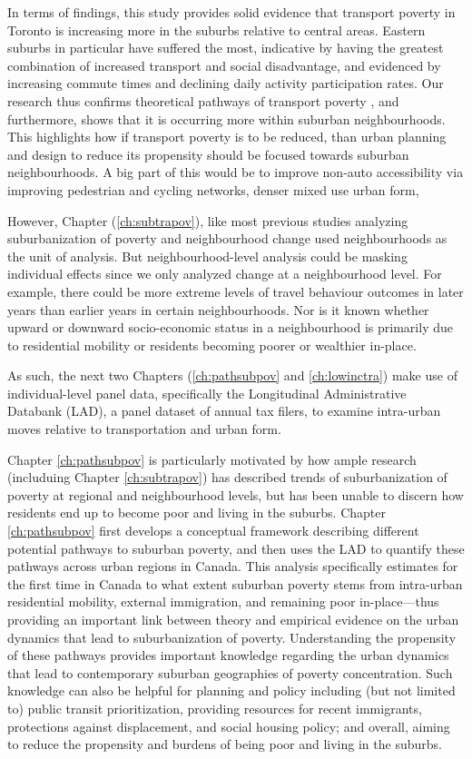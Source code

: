 In terms of findings, this study provides solid evidence that transport poverty in Toronto is increasing more in the suburbs relative to central areas. Eastern suburbs in particular have suffered the most, indicative by having the greatest combination of increased transport and social disadvantage, and evidenced by increasing commute times and declining daily activity participation rates. Our research thus confirms theoretical pathways of transport poverty \cite{lucas_transport_2012}, and furthermore, shows that it is occurring more within suburban neighbourhoods. This highlights how if transport poverty is to be reduced, than urban planning and design to reduce its propensity should be focused towards suburban neighbourhoods. A big part of this would be to improve non-auto accessibility via improving pedestrian and cycling networks, denser mixed use urban form, 

However, Chapter (\ref{ch:subtrapov}), like most previous studies analyzing suburbanization of poverty and neighbourhood change \cite{ades_are_2012,breau_pulling_2018,grant_changing_2020} used neighbourhoods as the unit of analysis. But neighbourhood-level analysis could be masking individual effects since we only analyzed change at a neighbourhood level. For example, there could be more extreme levels of travel behaviour outcomes in later years than earlier years in certain neighbourhoods. Nor is it known whether upward or downward socio-economic status in a neighbourhood is primarily due to residential mobility or residents becoming poorer or wealthier in-place.

As such, the next two Chapters (\ref{ch:pathsubpov} and \ref{ch:lowinctra}) make use of individual-level panel data, specifically the Longitudinal Administrative Databank (LAD), a panel dataset of annual tax filers, to examine intra-urban moves relative to transportation and urban form.

Chapter \ref{ch:pathsubpov} is particularly motivated by how ample research (includuing Chapter \ref{ch:subtrapov}) has described trends of suburbanization of poverty at regional and neighbourhood levels, but has been unable to discern how residents end up to become poor and living in the suburbs. Chapter \ref{ch:pathsubpov} first develops a conceptual framework describing different potential pathways to suburban poverty, and then uses the LAD to quantify these pathways across urban regions in Canada. This analysis specifically estimates for the first time in Canada to what extent suburban poverty stems from intra-urban residential mobility, external immigration, and remaining poor in-place---thus providing an important link between theory and empirical evidence on the urban dynamics that lead to suburbanization of poverty. Understanding the propensity of these pathways provides important knowledge regarding the urban dynamics that lead to contemporary suburban geographies of poverty concentration. Such knowledge can also be helpful for planning and policy including (but not limited to) public transit prioritization, providing resources for recent immigrants, protections against displacement, and social housing policy; and overall, aiming to reduce the propensity and burdens of being poor and living in the suburbs.

